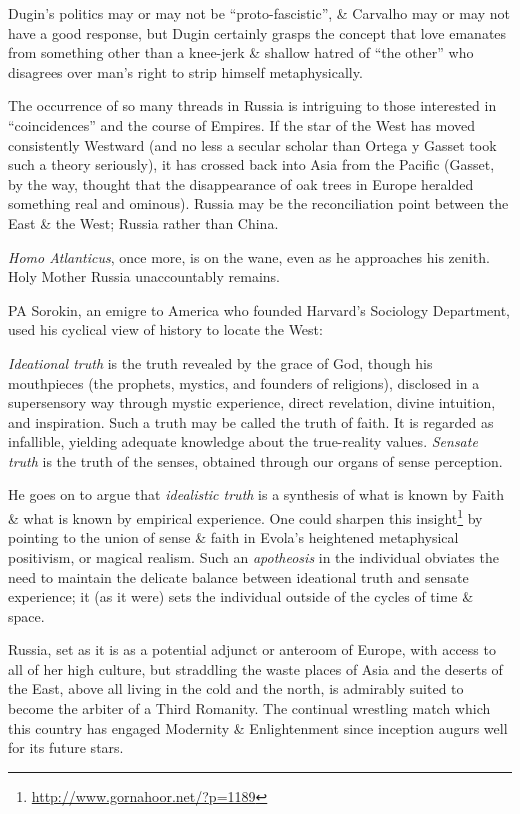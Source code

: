 Dugin's politics may or may not be ``proto-fascistic'', \& Carvalho may or may not have a good response, but Dugin certainly grasps the concept that love emanates from something other than a knee-jerk \& shallow hatred of ``the other'' who disagrees over man's right to strip himself metaphysically.

The occurrence of so many threads in Russia is intriguing to those interested in ``coincidences'' and the course of Empires. If the star of the West has moved consistently Westward (and no less a secular scholar than Ortega y Gasset took such a theory seriously), it has crossed back into Asia from the Pacific (Gasset, by the way, thought that the disappearance of oak trees in Europe heralded something real and ominous). Russia may be the reconciliation point between the East \& the West; Russia rather than China.

\emph{Homo Atlanticus}, once more, is on the wane, even as he approaches his zenith. Holy Mother Russia unaccountably remains.

PA Sorokin, an emigre to America who founded Harvard's Sociology Department, used his cyclical view of history to locate the West:

\begin{quotex}
\emph{Ideational truth} is the truth revealed by the grace of God, though his mouthpieces (the prophets, mystics, and founders of religions), disclosed in a supersensory way through mystic experience, direct revelation, divine intuition, and inspiration. Such a truth may be called the truth of faith. It is regarded as infallible, yielding adequate knowledge about the true-reality values. \emph{Sensate truth} is the truth of the senses, obtained through our organs of sense perception.
\end{quotex}


He goes on to argue that \emph{idealistic truth} is a synthesis of what is known by Faith \& what is known by empirical experience. One could sharpen this insight\footnote{\url{http://www.gornahoor.net/?p=1189}} by pointing to the union of sense \& faith in Evola's heightened metaphysical positivism, or magical realism. Such an \emph{apotheosis} in the individual obviates the need to maintain the delicate balance between ideational truth and sensate experience; it (as it were) sets the individual outside of the cycles of time \& space.

Russia, set as it is as a potential adjunct or anteroom of Europe, with access to all of her high culture, but straddling the waste places of Asia and the deserts of the East, above all living in the cold and the north, is admirably suited to become the arbiter of a Third Romanity. The continual wrestling match which this country has engaged Modernity \& Enlightenment since inception augurs well for its future stars.

